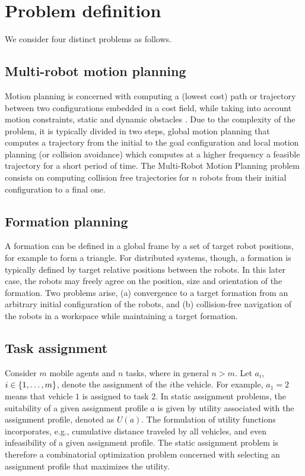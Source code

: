 
\section{Problem definition}\label{sec:2}

We consider four distinct problems as follows.

\subsection{Multi-robot motion planning}
Motion planning is concerned with computing a (lowest cost) path or trajectory between two configurations embedded in a cost field, while taking into account motion constraints, static and dynamic obstacles \citet{lavalle06}.
Due to the complexity of the problem, it is typically divided in two steps, global motion planning that computes a trajectory from the initial to the goal configuration and local motion planning (or collision avoidance) which computes at a higher frequency a feasible trajectory for a short period of time. The Multi-Robot Motion Planning problem consists on computing collision free trajectories for $n$ robots from their initial configuration to a final one.

\subsection{Formation planning}
A formation can be defined in a global frame by a set of target robot positions, for example to form a triangle. For distributed systems, though, a formation is typically defined by target relative positions between the robots. In this later case, the robots may freely agree on the position, size and orientation of the formation. Two problems arise, (a) convergence to a target formation from an arbitrary initial configuration of the robots, and (b) collision-free navigation of the robots in a workspace while maintaining a target formation.

\subsection{Task assignment}
Consider $m$ mobile agents and $n$ tasks, where in general $n > m$. Let $a_i$, $i \in \{1,\dots,m\}$, denote the assignment of the $i$the vehicle. For example, $a_1=2$ means that vehicle $1$ is assigned to task $2$. In static assignment problems, the suitability of a given assignment profile $a$ is given by utility associated with the assignment profile, denoted as $U(a)$. The formulation of utility functions incorporates, e.g., cumulative distance traveled by all vehicles, and even infeasibility of a given assignment profile. The static assignment problem is therefore a combinatorial optimization problem concerned with selecting an assignment profile that maximizes the utility.  

